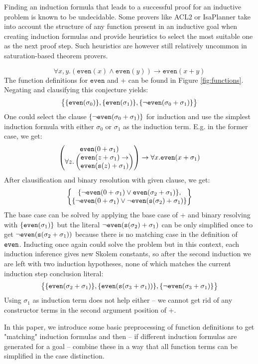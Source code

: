 Finding an induction formula that leads to a successful proof for an inductive problem is known to be undecidable. Some provers like ACL2 or IsaPlanner take into account the structure of any function present in an inductive goal when creating induction formulas and provide heuristics to select the most suitable one as the next proof step. Such heuristics are however still relatively uncommon in saturation-based theorem provers.
\begin{example}\label{ex:1}
$$\forall x,y. (\mathtt{even}(x)\land \mathtt{even}(y))\rightarrow \mathtt{even}(x+y)$$
The function definitions for $\mathtt{even}$ and + can be found in Figure \ref{fig:functions}. Negating and clausifying this conjecture yields:
$$\begin{Bmatrix}
\{\mathtt{even}(\sigma_0)\},\{\mathtt{even}(\sigma_1)\},\{\neg\mathtt{even}(\sigma_0+\sigma_1)\}
\end{Bmatrix}$$
One could select the clause $\{\neg\mathtt{even}(\sigma_0+\sigma_1)\}$ for induction and use the simplest induction formula with either $\sigma_0$ or $\sigma_1$ as the induction term. E.g. in the former case, we get:
$$\begin{pmatrix}\mathtt{even}(0+\sigma_1)\\
\forall z.\begin{pmatrix}
\mathtt{even}(z+\sigma_1)\rightarrow\\
\mathtt{even}(\mathtt{s}(z)+\sigma_1)
\end{pmatrix}\end{pmatrix}\rightarrow \forall x.\mathtt{even}(x+\sigma_1)$$
After clausification and binary resolution with given clause, we get:
$$\begin{Bmatrix}
\{\neg\mathtt{even}(0+\sigma_1)\lor \mathtt{even}(\sigma_2+\sigma_1)\},\\
\{\neg\mathtt{even}(0+\sigma_1)\lor \neg\mathtt{even}(\mathtt{s}(\sigma_2)+\sigma_1)\}
\end{Bmatrix}$$
The base case can be solved by applying the base case of + and binary resolving with $\{\mathtt{even}(\sigma_1)\}$ but the literal $\neg\mathtt{even}(\mathtt{s}(\sigma_2)+\sigma_1)$ can be only simplified once to get $\neg\mathtt{even}(\mathtt{s}(\sigma_2+\sigma_1))$ because there is no matching case in the definition of $\mathtt{even}$. Inducting once again could solve the problem but in this context, each induction inference gives new Skolem constants, so after the second induction we are left with two induction hypotheses, none of which matches the current induction step conclusion literal:
$$\begin{Bmatrix}
\{\mathtt{even}(\sigma_2+\sigma_1)\},\{\mathtt{even}(\mathtt{s}(\sigma_3+\sigma_1))\},\{\neg\mathtt{even}(\sigma_3+\sigma_1)\}
\end{Bmatrix}$$
Using $\sigma_1$ as induction term does not help either -- we cannot get rid of any constructor terms in the second argument position of +.
\end{example}
In this paper, we introduce some basic preprocessing of function definitions to get "matching" induction formulas and then -- if different induction formulas are generated for a goal -- combine these in a way that all function terms can be simplified in the case distinction.

